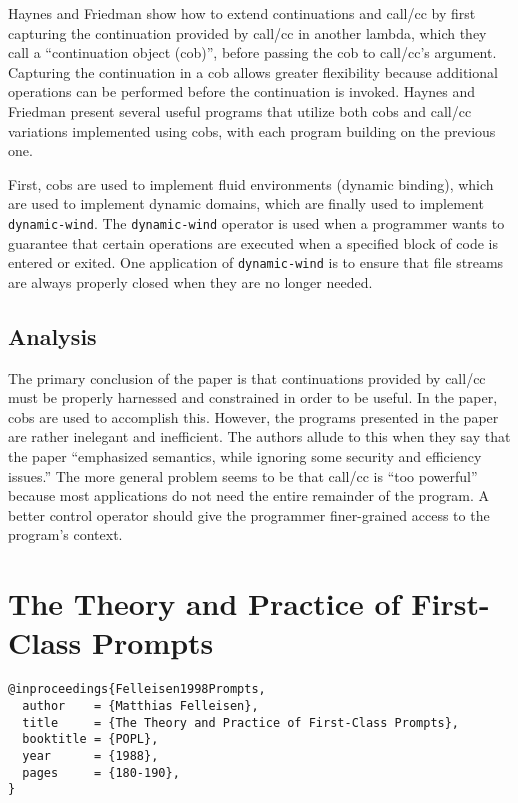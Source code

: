 \documentclass[letterpaper]{llncs}
\begin{document}
Haynes and Friedman show how to extend continuations and call/cc by first capturing the continuation provided by call/cc in another lambda, which they call a ``continuation object (cob)'', before passing the cob to call/cc's argument. Capturing the continuation in a cob allows greater flexibility because additional operations can be performed before the continuation is invoked. Haynes and Friedman present several useful programs that utilize both cobs and call/cc variations implemented using cobs, with each program building on the previous one. 

First, cobs are used to implement fluid environments (dynamic binding), which are used to implement dynamic domains, which are finally used to implement \texttt{dynamic-wind}. The \texttt{dynamic-wind} operator is used when a programmer wants to guarantee that certain operations are executed when a specified block of code is entered or exited. One application of \texttt{dynamic-wind} is to ensure that file streams are always properly closed when they are no longer needed.

\subsection*{Analysis}

The primary conclusion of the paper is that continuations provided by call/cc must be properly harnessed and constrained in order to be useful. In the paper, cobs are used to accomplish this. However, the programs presented in the paper are rather inelegant and inefficient. The authors allude to this when they say that the paper ``emphasized semantics, while ignoring some security and efficiency issues.'' The more general problem seems to be that call/cc is ``too powerful'' because most applications do not need the entire remainder of the program. A better control operator should give the programmer finer-grained access to the program's context.


\section*{The Theory and Practice of First-Class Prompts}%

\begin{verbatim}
@inproceedings{Felleisen1998Prompts,
  author    = {Matthias Felleisen},
  title     = {The Theory and Practice of First-Class Prompts},
  booktitle = {POPL},
  year      = {1988},
  pages     = {180-190},
}
\end{verbatim}
\end{document}
